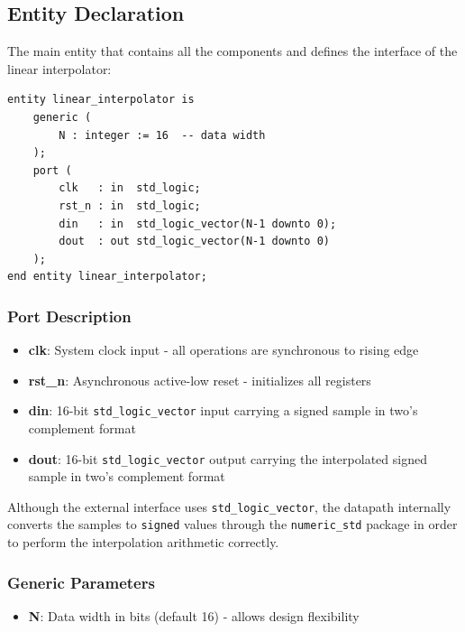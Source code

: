 \documentclass[a4paper,11pt]{article}
\begin{document}
\subsection{Entity Declaration}

The main entity that contains all the components and defines the interface of the linear interpolator:

\begin{lstlisting}
entity linear_interpolator is
    generic (
        N : integer := 16  -- data width
    );
    port (
        clk   : in  std_logic;
        rst_n : in  std_logic;
        din   : in  std_logic_vector(N-1 downto 0);
        dout  : out std_logic_vector(N-1 downto 0)
    );
end entity linear_interpolator;
\end{lstlisting}

\subsubsection{Port Description}

\begin{itemize}
    \item \textbf{clk}: System clock input - all operations are synchronous to rising edge
    \item \textbf{rst\_n}: Asynchronous active-low reset - initializes all registers
    \item \textbf{din}: 16-bit \texttt{std\_logic\_vector} input carrying a signed sample in two's complement format
    \item \textbf{dout}: 16-bit \texttt{std\_logic\_vector} output carrying the interpolated signed sample in two's complement format
\end{itemize}

Although the external interface uses \texttt{std\_logic\_vector}, the datapath internally converts the samples to \texttt{signed} values through the \texttt{numeric\_std} package in order to perform the interpolation arithmetic correctly.

\subsubsection{Generic Parameters}

\begin{itemize}
    \item \textbf{N}: Data width in bits (default 16) - allows design flexibility
\end{itemize}
\end{document}
